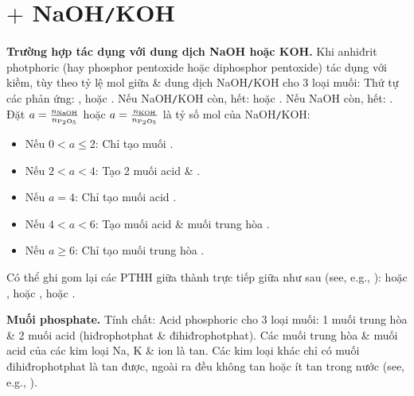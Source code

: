 \documentclass{article}
\begin{document}
\section{ $+$ NaOH{\tt/}KOH}
\noindent\textbf{\textsf{Trường hợp  tác dụng với dung dịch NaOH hoặc KOH.}} Khi anhiđrit photphoric (hay phosphor pentoxide hoặc diphosphor pentoxide)  tác dụng với kiềm, tùy theo tỷ lệ mol giữa  \& dung dịch NaOH{\tt/}KOH cho 3 loại muối: Thứ tự các phản ứng: ,  hoặc . Nếu NaOH{\tt/}KOH còn,  hết:  hoặc . Nếu NaOH còn,  hết: . Đặt $a = \frac{n_{\rm NaOH}}{n_{\ce{P2O5}}}$ hoặc $a = \frac{n_{\rm KOH}}{n_{\ce{P2O5}}}$ là tỷ số mol của NaOH{\tt/}KOH:
\begin{itemize}
	\item Nếu $0 < a\le2$: Chỉ tạo muối .
	\item Nếu $2 < a < 4$: Tạo 2 muối acid  \& .
	\item Nếu $a = 4$: Chỉ tạo muối acid .
	\item Nếu $4 < a < 6$: Tạo muối acid  \& muối trung hòa .
	\item Nếu $a\ge6$: Chỉ tạo muối trung hòa .
\end{itemize}
Có thể ghi gom lại các {\rm PTHH} giữa  thành trực tiếp giữa  như sau (see, e.g., \cite[pp. 204--205]{An_chuoi_PUHH}):  hoặc ,  hoặc ,  hoặc .

\textbf{Muối phosphate.} Tính chất: Acid phosphoric  cho 3 loại muối: 1 muối trung hòa \& 2 muối acid (hiđrophotphat \& đihiđrophotphat). Các muối trung hòa \& muối acid của các kim loại Na, K \& ion  là tan. Các kim loại khác chỉ có muối đihiđrophotphat là tan được, ngoài ra đều không tan hoặc ít tan trong nước (see, e.g., \cite[p. 206]{An_chuoi_PUHH}).

\end{document}
